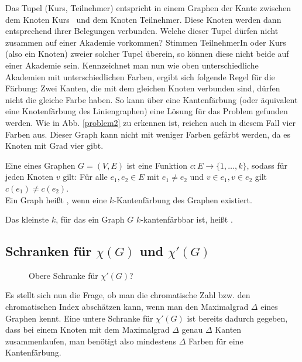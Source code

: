 Das Tupel  (Kurs, Teilnehmer) entspricht in einem Graphen der Kante zwischen dem Knoten \glqq Kurs \grqq\ und dem Knoten \glqq Teilnehmer\grqq. Diese Knoten werden dann entsprechend ihrer Belegungen verbunden. Welche dieser Tupel dürfen nicht zusammen auf einer Akademie vorkommen? Stimmen TeilnehmerIn oder Kurs (also ein Knoten) zweier solcher Tupel überein, so können diese nicht beide auf einer Akademie sein.  Kennzeichnet man nun wie oben unterschiedliche Akademien mit unterschiedlichen Farben, ergibt sich folgende Regel für die Färbung: Zwei Kanten, die mit dem gleichen Knoten verbunden sind, dürfen nicht die gleiche Farbe haben. 
So kann über eine Kantenfärbung (oder äquivalent eine Knotenfärbung des Liniengraphen)  eine Lösung für das Problem gefunden werden. Wie in Abb. \ref{problem2} zu erkennen ist, reichen auch in diesem Fall vier Farben aus. Dieser Graph kann nicht mit weniger Farben gefärbt werden, da es Knoten mit Grad vier gibt.
	\begin{df}
		Eine  eines Graphen $G=(V,E)$ ist eine Funktion $c : E \to \{1,\dots,k\}$, sodass für jeden Knoten $v$ gilt:
		Für alle $e_1,e_2\in E$ mit $e_1\neq e_2$ und $v\in e_1,v\in e_2$ gilt $c(e_1)\neq c(e_2)$.\\
		Ein Graph heißt , wenn eine $k$-Kantenfärbung des Graphen existiert.
	\end{df}
	\begin{df}
Das kleinste $k$, für das ein Graph $G$ $k$-kantenfärbbar ist, heißt .
	\end{df}



\subsection{Schranken für $\chi(G)$ und $\chi '(G)$} 
\begin{figure}
\centering
{}
\caption{Obere Schranke für $\chi'(G)$?}
\label{chi_oben}
\end{figure}
Es stellt sich nun die Frage, ob man die chromatische Zahl bzw. den chromatischen Index abschätzen
 kann, wenn man den Maximalgrad $\Delta$ eines Graphen kennt. 
Eine untere Schranke für $\chi'(G)$ ist bereits dadurch gegeben, dass bei einem Knoten mit dem Maximalgrad $\Delta$ genau $\Delta$ Kanten zusammenlaufen, man benötigt also mindestens $\Delta$ Farben für eine Kantenfärbung.

